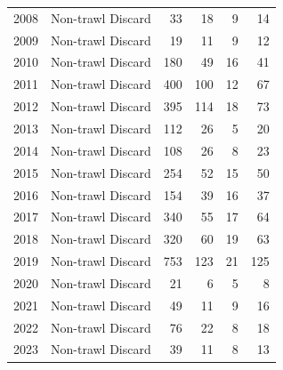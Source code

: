 \documentclass[
]{article}
\begin{document}
\begin{longtable}{rlrrrr}
2008 & Non-trawl Discard & 33 & 18 & 9 & 14 \\ 
2009 & Non-trawl Discard & 19 & 11 & 9 & 12 \\ 
2010 & Non-trawl Discard & 180 & 49 & 16 & 41 \\ 
2011 & Non-trawl Discard & 400 & 100 & 12 & 67 \\ 
2012 & Non-trawl Discard & 395 & 114 & 18 & 73 \\ 
2013 & Non-trawl Discard & 112 & 26 & 5 & 20 \\ 
2014 & Non-trawl Discard & 108 & 26 & 8 & 23 \\ 
2015 & Non-trawl Discard & 254 & 52 & 15 & 50 \\ 
2016 & Non-trawl Discard & 154 & 39 & 16 & 37 \\ 
2017 & Non-trawl Discard & 340 & 55 & 17 & 64 \\ 
2018 & Non-trawl Discard & 320 & 60 & 19 & 63 \\ 
2019 & Non-trawl Discard & 753 & 123 & 21 & 125 \\ 
2020 & Non-trawl Discard & 21 & 6 & 5 & 8 \\ 
2021 & Non-trawl Discard & 49 & 11 & 9 & 16 \\ 
2022 & Non-trawl Discard & 76 & 22 & 8 & 18 \\ 
2023 & Non-trawl Discard & 39 & 11 & 8 & 13 \\ 
\bottomrule

\end{longtable}

\endgroup

\newpage{}

\begingroup
\fontsize{9.0pt}{11.0pt}\selectfont
\end{document}
